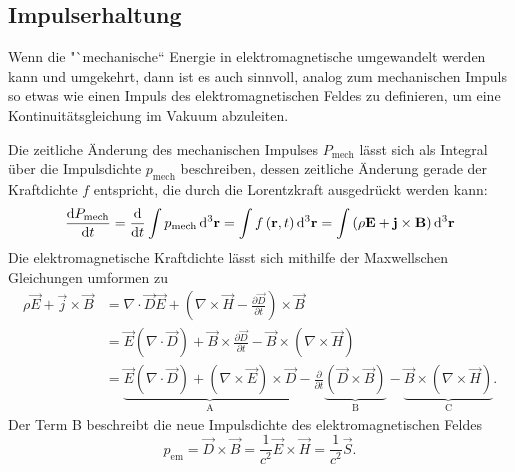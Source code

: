 \subsection{Impulserhaltung}

Wenn die "`mechanische`` Energie in elektromagnetische umgewandelt werden kann und umgekehrt, dann ist es auch sinnvoll, analog zum mechanischen Impuls so etwas wie einen Impuls des elektromagnetischen Feldes zu definieren, um eine Kontinuitätsgleichung im Vakuum abzuleiten.

Die zeitliche Änderung des mechanischen Impulses $P_{\text{mech}}$ lässt sich als Integral über die Impulsdichte $p_{\text{mech}}$ beschreiben, dessen zeitliche Änderung gerade der Kraftdichte $f$ entspricht, die durch die Lorentzkraft ausgedrückt werden kann:
\begin{equation*}
	\frac{\mathop{}\!\mathrm{d} P_{\text{mech}}}{\mathop{}\!\mathrm{d} t}=\frac{\mathop{}\!\mathrm{d} }{\mathop{}\!\mathrm{d} t}\int p_{\text{mech}}\mathop{}\!\mathrm{d} ^{3}\mathbf{r}=\int f\left(\mathbf{r},t\right)\mathop{}\!\mathrm{d} ^{3}\mathbf{r}=\int \left(\rho \mathbf{E}+\mathbf{j}\times \mathbf{B}\right)\mathop{}\!\mathrm{d} ^{3}\mathbf{r}
\end{equation*}
Die elektromagnetische Kraftdichte lässt sich mithilfe der Maxwellschen Gleichungen umformen zu
\begin{align*}
	\rho \vec {E}+\vec {j}\times \vec {B} & =\nabla \cdot \vec {D}\vec {E}+\left(\nabla \times \vec {H}-\frac{\partial \vec {D}}{\partial t}\right)\times \vec {B}                                                                                                                                                                                                         \\
	                                      & =\vec {E}\left(\nabla \cdot \vec {D}\right)+\vec {B}\times \frac{\partial \vec {D}}{\partial t}-\vec {B}\times \left(\nabla \times \vec {H}\right)                                                                                                                                                                             \\
	                                      & =\underset{\mathrm{A}}{\underbrace{\vec {E}\left(\nabla \cdot \vec {D}\right)+\left(\nabla \times \vec {E}\right)\times \vec {D}}}-\frac{\partial }{\partial t}\underset{\mathrm{B}}{\underbrace{\left(\vec {D}\times \vec {B}\right)}}-\underset{\mathrm{C}}{\underbrace{\vec {B}\times \left(\nabla \times \vec {H}\right)}}.
\end{align*}
Der Term B beschreibt die neue Impulsdichte des elektromagnetischen Feldes
\begin{equation*}
	p_{\mathrm{em}}=\vec {D}\times \vec {B}=\frac{1}{c^{2}}\vec {E}\times \vec {H}=\frac{1}{c^{2}}\vec {S}.
\end{equation*}
